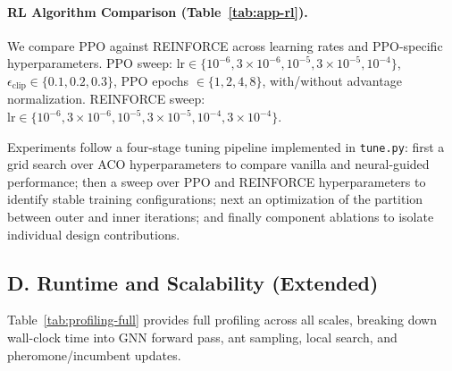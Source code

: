 \documentclass[sigconf,anonymous,review]{acmart}
\theoremstyle{definition}
\theoremstyle{plain}
\begin{document}
\paragraph{RL Algorithm Comparison (Table~\ref{tab:app-rl}).}
We compare PPO against REINFORCE across learning rates and PPO-specific hyperparameters.
PPO sweep: $\text{lr} \in \{10^{-6}, 3\times10^{-6}, 10^{-5}, 3\times10^{-5}, 10^{-4}\}$, $\epsilon_{\text{clip}} \in \{0.1, 0.2, 0.3\}$, PPO epochs $\in \{1, 2, 4, 8\}$, with/without advantage normalization.
REINFORCE sweep: $\text{lr} \in \{10^{-6}, 3\times10^{-6}, 10^{-5}, 3\times10^{-5}, 10^{-4}, 3\times10^{-4}\}$.

\begin{table}[h]
\centering
\caption{RL algorithm comparison. Best configuration per algorithm.}
\label{tab:app-rl}
\end{table}

Experiments follow a four-stage tuning pipeline implemented in \texttt{tune.py}: first a grid search over ACO hyperparameters to compare vanilla and neural-guided performance; then a sweep over PPO and REINFORCE hyperparameters to identify stable training configurations; next an optimization of the partition between outer and inner iterations; and finally component ablations to isolate individual design contributions.

\subsection{D. Runtime and Scalability (Extended)}

Table~\ref{tab:profiling-full} provides full profiling across all scales, breaking down wall-clock time into GNN forward pass, ant sampling, local search, and pheromone/incumbent updates.
\end{document}
